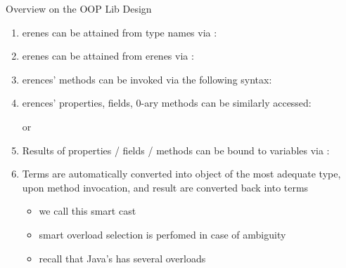 \documentclass[handout]{beamer}
\begin{document}
\begin{frame}[allowframebreaks]{Overview on the OOP Lib Design}
\begin{enumerate}
        \framebreak

        \item {}erenes can be attained from type names via :

        \bigskip

        \item {}erenes can be attained from erenes via :

        \framebreak

        \item {}erences' methods can be invoked via the following syntax:
        \begin{center}
        \end{center}

        \smallskip

        \item {}erences' properties, fields, 0-ary methods can be similarly accessed:
        \begin{center}
             \quad or \quad {}
        \end{center}

        \smallskip

        \item Results of properties / fields / methods can be bound to variables via :

        \framebreak

        \item Terms are automatically converted into object of the \alert{most adequate} type, upon method invocation, and result are converted back into terms
        \begin{itemize}
            \item we call this \alert{smart cast}
            \item smart \alert{overload selection} is perfomed in case of ambiguity
        \end{itemize}
        \begin{itemize}\small
            \item recall that Java's  has several overloads
        \end{itemize}


\end{enumerate}
\end{frame}
\end{document}
